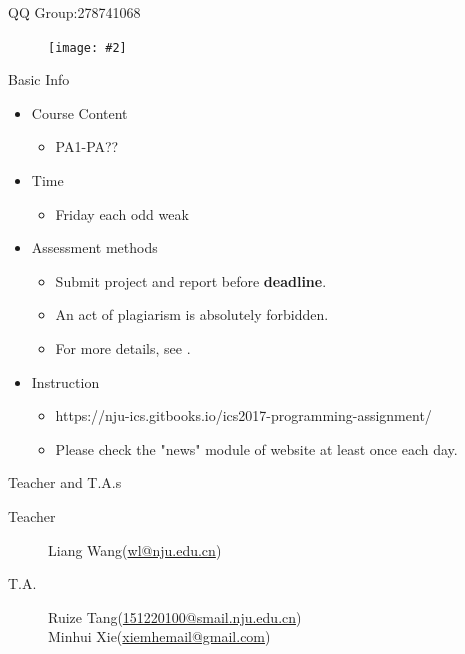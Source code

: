 \documentclass{beamer}
\title{\titletext}
\subtitle{Introduction}
\author{Xie}
\institute{xiemhemail@gmail.com}
\date{Sep 8th, 2017}
\newcommand{\fignocaption}[2]{
	\begin{figure}[htp]
		\centering
		\texttt{[image: \#2]}
	\end{figure}
}
\begin{document}
	\maketitle
	
\begin{frame}{QQ Group:278741068}
	\fignocaption{width=200pt}{qqqrcode.jpg}
\end{frame}

\begin{frame}{Basic Info}
	\begin{itemize}
		\item Course Content
		\begin{itemize}
			\item PA1-PA??
		\end{itemize}
		\item Time
		\begin{itemize}
			\item Friday each odd weak
		\end{itemize}
		\item Assessment methods
			\begin{itemize}
				\item Submit project and report before \textbf{deadline}.
				\item An act of plagiarism is absolutely forbidden.
				\item For more details, see \href{https://nju-ics.gitbooks.io/ics2017-programming-assignment/content/submit.html}{}.
			\end{itemize}
		\item \alert{Instruction}
		\begin{itemize}
			\item https://nju-ics.gitbooks.io/ics2017-programming-assignment/
			\item \alert{\huge Please check the "news" module of website at least once each day.}
		\end{itemize}
	\end{itemize}
\end{frame}


\begin{frame}{Teacher and T.A.s}
	\begin{description}
		\item[Teacher] Liang Wang(\href{mailto:wl@nju.edu.cn}{wl@nju.edu.cn})
		\item[T.A.] Ruize Tang(\href{mailto:151220100@smail.nju.edu.cn}{151220100@smail.nju.edu.cn})\\
					Minhui Xie(\href{mailto:xiemhemail@gmail.com}{xiemhemail@gmail.com})
	\end{description}
\end{frame}
\end{document}
